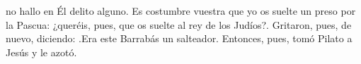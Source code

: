  no hallo en Él delito alguno. Es costumbre vuestra que yo os suelte un preso por la Pascua: ¿queréis, pues, que os suelte al rey de los Judíos?{\guillemotright}.
Gritaron, pues, de nuevo, diciendo: .Era este Barrabás un salteador. Entonces, pues, tomó Pilato a Jesús y le azotó.